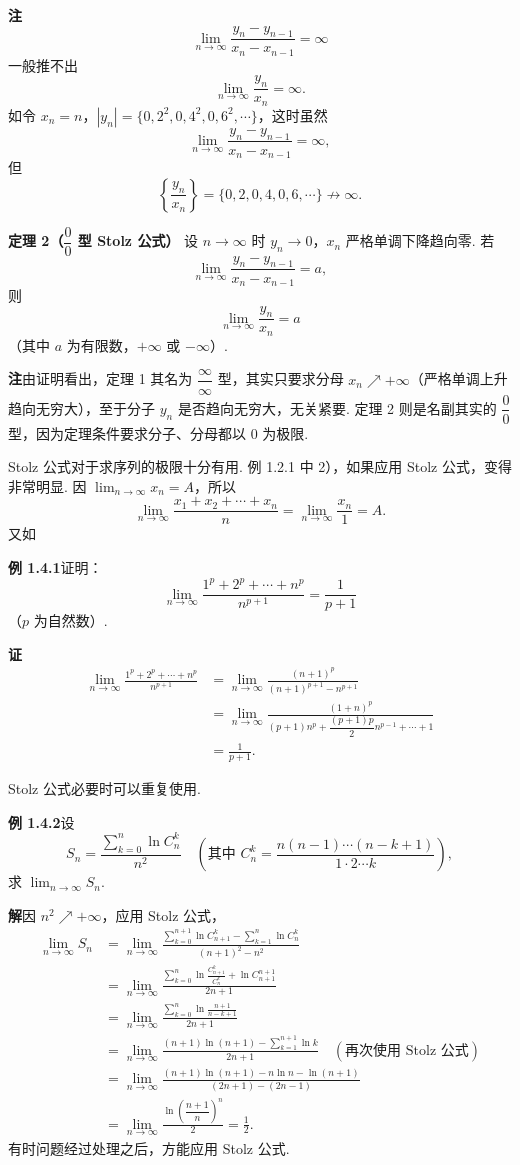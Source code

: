 \documentclass[UTF8, 12pt, fontset=fandol, oneside]{ctexart}
\begin{document}
\noindent\textbf{注}\quad
\[
  \lim_{n\to\infty}\frac{y_n-y_{n-1}}{x_n-x_{n-1}}=\infty
\]
一般推不出
\[
  \lim_{n\to\infty}\frac{y_n}{x_n}=\infty.
\]
如令 $x_n=n$，$|y_n|=\{0,2^2,0,4^2,0,6^2,\cdots\}$，这时虽然
\[
  \lim_{n\to\infty}\frac{y_n-y_{n-1}}{x_n-x_{n-1}}=\infty,
\]
但
\[
  \left\{\frac{y_n}{x_n}\right\}=\{0,2,0,4,0,6,\cdots\}\not\to\infty.
\]

\noindent\textbf{定理 2（$\dfrac00$ 型 Stolz 公式）}\quad
设 $n\to\infty$ 时 $y_n\to0$，$x_n$ 严格单调下降趋向零.
若
\[
  \lim_{n\to\infty}\frac{y_n-y_{n-1}}{x_n-x_{n-1}}=a,
\]
则
\[
  \lim_{n\to\infty}\frac{y_n}{x_n}=a
\]
（其中 $a$ 为有限数，$+\infty$ 或 $-\infty$）.

\noindent\textbf{注}\quad 由证明看出，定理 1 其名为 $\dfrac\infty\infty$ 型，其实只要求分母 $x_n\nearrow+\infty$（严格单调上升趋向无穷大），至于分子 $y_n$ 是否趋向无穷大，无关紧要. 定理 2 则是名副其实的 $\dfrac00$ 型，因为定理条件要求分子、分母都以 0 为极限.

Stolz 公式对于求序列的极限十分有用. 例 1.2.1 中 2），如果应用 Stolz 公式，变得非常明显. 因 $\displaystyle\lim_{n\to\infty}x_n=A$，所以
\[
  \lim_{n\to\infty}\frac{x_1+x_2+\cdots+x_n}{n}
  =\lim_{n\to\infty}\frac{x_n}{1}=A.
\]
又如

\noindent\textbf{例 1.4.1}\quad 证明：
\[
  \lim_{n\to\infty}\frac{1^p+2^p+\cdots+n^p}{n^{p+1}}
  =\frac1{p+1}
\]
（$p$ 为自然数）.

\noindent\textbf{证}\quad
\[
\begin{aligned}
  \lim_{n\to\infty}\frac{1^p+2^p+\cdots+n^p}{n^{p+1}}
  &=\lim_{n\to\infty}\frac{(n+1)^p}{(n+1)^{p+1}-n^{p+1}}\\
  &=\lim_{n\to\infty}
  \frac{(1+n)^p}{(p+1)n^p+\dfrac{(p+1)p}{2}n^{p-1}+\cdots+1}\\
  &=\frac1{p+1}.
\end{aligned}
\]

Stolz 公式必要时可以重复使用.

\noindent\textbf{例 1.4.2}\quad 设
\[
  S_n=\frac{\displaystyle\sum_{k=0}^n\ln C_n^k}{n^2}
  \quad\left(\text{其中 }C_n^k=\frac{n(n-1)\cdots(n-k+1)}{1\cdot2\cdots k}\right),
\]
求 $\displaystyle\lim_{n\to\infty}S_n$.

\noindent\textbf{解}\quad 因 $n^2\nearrow+\infty$，应用 Stolz 公式，
\[
\begin{aligned}
  \lim_{n\to\infty}S_n
  &=\lim_{n\to\infty}
  \frac{\displaystyle\sum_{k=0}^{n+1}\ln C_{n+1}^k-\sum_{k=1}^n\ln C_n^k}{(n+1)^2-n^2}\\
  &=\lim_{n\to\infty}
  \frac{\displaystyle\sum_{k=0}^n\ln\frac{C_{n+1}^k}{C_n^k}+\ln C_{n+1}^{n+1}}{2n+1}\\
  &=\lim_{n\to\infty}
  \frac{\displaystyle\sum_{k=0}^n\ln\frac{n+1}{n-k+1}}{2n+1}\\
  &=\lim_{n\to\infty}
  \frac{(n+1)\ln(n+1)-\displaystyle\sum_{k=1}^{n+1}\ln k}{2n+1}
  \quad(\text{再次使用 Stolz 公式})\\
  &=\lim_{n\to\infty}
  \frac{(n+1)\ln(n+1)-n\ln n-\ln(n+1)}
  {(2n+1)-(2n-1)}\\
  &=\lim_{n\to\infty}
  \frac{\ln\left(\dfrac{n+1}{n}\right)^n}{2}
  =\frac12.
\end{aligned}
\]
有时问题经过处理之后，方能应用 Stolz 公式.
\end{document}

